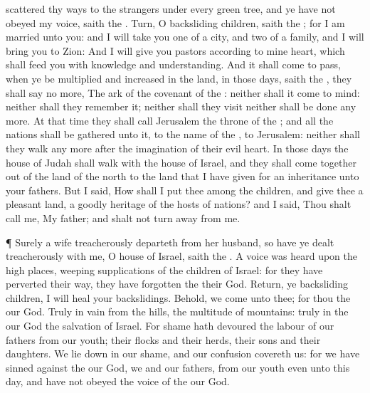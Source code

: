 {scattered thy
ways to the
strangers under every
green
tree, and ye have not
obeyed my
voice,
saith the
{}.
Turn, O
backsliding
children,
saith the
{}; for I am
married unto you: and I will
take you
one of a
city, and
two of a
family, and I will
bring you to
Zion:
And I will
give you
pastors according to mine
heart, which shall
feed you with
knowledge and
understanding.
And it shall come to pass, when ye be
multiplied and
increased in the
land, in those
days,
saith the
{}, they shall
say no more, The
ark of the
covenant of the
{}: neither shall it
come to
mind: neither shall they
remember it; neither shall they
visit
{} neither shall
{} be
done any more.
At that
time they shall
call
Jerusalem the
throne of the
{}; and all the
nations shall be
gathered unto it, to the
name of the
{}, to
Jerusalem: neither shall they
walk any more
after the
imagination of their
evil
heart.
In those
days the
house of
Judah shall
walk with the
house of
Israel, and they shall
come
together out of the
land of the
north to the
land that I have given for an
inheritance unto your
fathers.
But I
said, How shall I
put thee among the
children, and
give thee a
pleasant
land, a
goodly
heritage of the
hosts of
nations? and I
said, Thou shalt
call me, My
father; and shalt not turn
away from
me.
\par }{\PP {}¶
Surely
{} a
wife
treacherously departeth from her
husband, so have ye dealt
treacherously with me, O
house of
Israel,
saith the
{}.
A
voice was
heard upon the high
places,
weeping
{}
supplications of the
children of
Israel: for they have
perverted their
way,
{} they have
forgotten the
{} their
God.
Return, ye
backsliding
children,
{} I will
heal your
backslidings. Behold, we
come unto thee; for thou
{} the
{} our
God.
Truly in
vain
{} from the
hills,
{} the
multitude of
mountains:
truly in the
{} our
God
{} the
salvation of
Israel.
For
shame hath
devoured the
labour of our
fathers from our
youth; their
flocks and their
herds, their
sons and their
daughters.
We lie
down in our
shame, and our
confusion
covereth us: for we have
sinned against the
{} our
God, we and our
fathers, from our
youth even unto this
day, and have not
obeyed the
voice of the
{} our
God.

}
